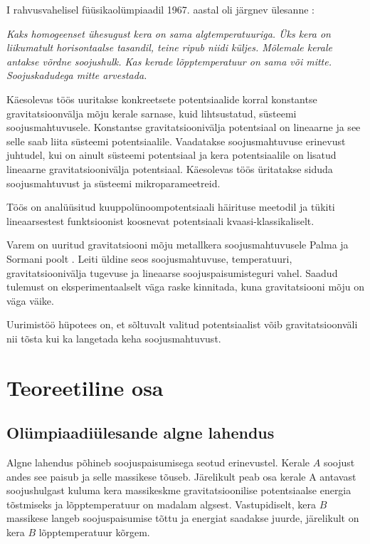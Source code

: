 \documentclass{trkut}%
\begin{document}
\maketitle%
\tableofcontents%
\nummerdame%
I rahvusvahelisel füüsikaolümpiaadil 1967. aastal oli järgnev ülesanne \parencite[6]{ipho67}:

\textit{Kaks homogeenset ühesugust kera on sama algtemperatuuriga. Üks kera on liikumatult horisontaalse tasandil, teine ripub niidi küljes. Mõlemale kerale antakse võrdne soojushulk. Kas kerade lõpptemperatuur on sama või mitte. Soojuskadudega mitte arvestada.}

Käesolevas töös uuritakse konkreetsete potentsiaalide korral konstantse gravitatsioonvälja mõju kerale sarnase, kuid lihtsustatud, süsteemi soojusmahtuvusele.
Konstantse gravitatsioonivälja potentsiaal on lineaarne ja see selle saab liita süsteemi potentsiaalile.
Vaadatakse soojusmahtuvuse erinevust juhtudel, kui on ainult süsteemi potentsiaal ja kera potentsiaalile on lisatud lineaarne gravitatsioonivälja potentsiaal.
Käesolevas töös üritatakse siduda soojusmahtuvust ja süsteemi mikroparameetreid.

Töös on analüüsitud kuuppolünoompotentsiaali häirituse meetodil ja tükiti lineaarsestest funktsioonist koosnevat potentsiaali kvaasi-klassikaliselt.

Varem on uuritud gravitatsiooni mõju metallkera soojusmahtuvusele Palma ja Sormani poolt \parencite{palma15}.
Leiti üldine seos soojusmahtuvuse, temperatuuri, gravitatsioonivälja tugevuse ja lineaarse soojuspaisumisteguri vahel.
Saadud tulemust on eksperimentaalselt väga raske kinnitada, kuna gravitatsiooni mõju on väga väike.

Uurimistöö hüpotees on, et sõltuvalt valitud potentsiaalist võib gravitatsioonväli nii tõsta kui ka langetada keha soojusmahtuvust.
\chapter{Teoreetiline osa}

\section{Olümpiaadiülesande algne lahendus}

Algne lahendus põhineb soojuspaisumisega seotud erinevustel. Kerale $A$ soojust andes see paisub ja selle massikese tõuseb. Järelikult peab osa kerale A antavast soojushulgast kuluma kera massikeskme gravitatsioonilise potentsiaalse energia tõstmiseks ja lõpptemperatuur on madalam algsest. Vastupidiselt, kera $B$ massikese langeb soojuspaisumise tõttu ja energiat saadakse juurde, järelikult on kera $B$ lõpptemperatuur kõrgem. \parencite[6-7]{ipho67}
\end{document}
